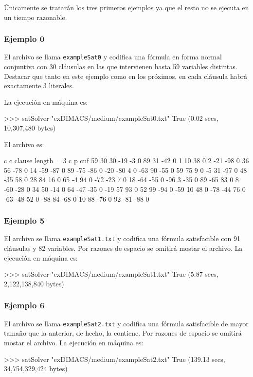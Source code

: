 Únicamente se tratarán los tres primeros ejemplos ya que el resto no se ejecuta en un tiempo razonable.

\subsubsection{Ejemplo 0}
El archivo se llama \texttt{exampleSat0} y codifica una fórmula en forma normal conjuntiva con 30 cláusulas en las que intervienen hasta 59 variables distintas. \\ 

Destacar que tanto en este ejemplo como en los próximos, en cada cláusula habrá exactamente 3 literales.

La ejecución en máquina es:
\begin{code}
>>> satSolver "exDIMACS/medium/exampleSat0.txt"
True
(0.02 secs, 10,307,480 bytes)
\end{code}

\newpage

El archivo es:

\begin{codigo}
c 
c    clause length = 3 
c
p cnf 59 30
30 -19 -3 0
89 31 -42 0
1 10 38 0
2 -21 -98 0
36 56 -78 0
14 -59 -87 0
89 -75 -86 0
-20 -80 4 0
-63 90 -55 0
59 75 9 0
-5 31 -97 0
48 -35 58 0
28 84 16 0
65 -4 94 0
-72 -23 7 0
18 -64 -55 0
-96 3 -35 0
89 -65 83 0
8 -60 -28 0
34 50 -14 0
64 -47 -35 0
-19 57 93 0
52 99 -94 0
-59 10 48 0
-78 -44 76 0
-63 -48 52 0
-88 84 -68 0
10 88 -76 0
92 -81 -88 0
\end{codigo}

\subsubsection{Ejemplo 5}
El archivo se llama \texttt{exampleSat1.txt} y codifica una fórmula satisfacible con 91 cláusulas y 82 variables. Por razones de espacio se omitirá mostar el archivo. La ejecución en máquina es:
\begin{code}
>>> satSolver "exDIMACS/medium/exampleSat1.txt"
True
(5.87 secs, 2,122,138,840 bytes)
\end{code}

\subsubsection{Ejemplo 6}
El archivo se llama \texttt{exampleSat2.txt} y codifica una fórmula satisfacible de mayor tamaño que la anterior, de hecho, la contiene. Por razones de espacio se omitirá mostar el archivo. La ejecución en máquina es:
\begin{code}
>>> satSolver "exDIMACS/medium/exampleSat2.txt"
True
(139.13 secs, 34,754,329,424 bytes)
\end{code}

